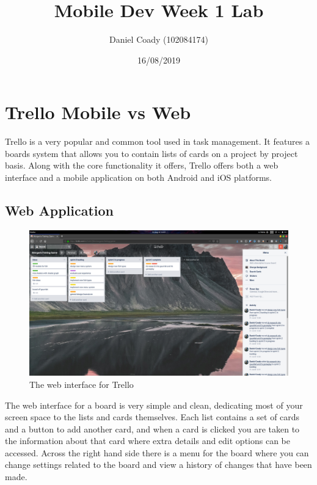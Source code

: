 \documentclass{scrartcl}
\title{Mobile Dev Week 1 Lab}
\author{Daniel Coady (102084174)}
\date{16/08/2019}
\begin{document}
\maketitle

\section*{Trello Mobile vs Web}
Trello is a very popular and common tool used in task management. It features a boards system that allows
you to contain lists of cards on a project by project basis. Along with the core functionality it offers,
Trello offers both a web interface and a mobile application on both Android and iOS platforms.

\subsection*{Web Application}
\begin{figure}[h]
    \centering
    \includegraphics[scale=0.2]{images/trelloweb.png}
    \caption{The web interface for Trello}
\end{figure}

The web interface for a board is very simple and clean, dedicating most of your screen space to the lists
and cards themselves. Each list contains a set of cards and a button to add another card, and when a card
is clicked you are taken to the information about that card where extra details and edit options can be
accessed. Across the right hand side there is a menu for the board where you can change settings related
to the board and view a history of changes that have been made.
\end{document}
